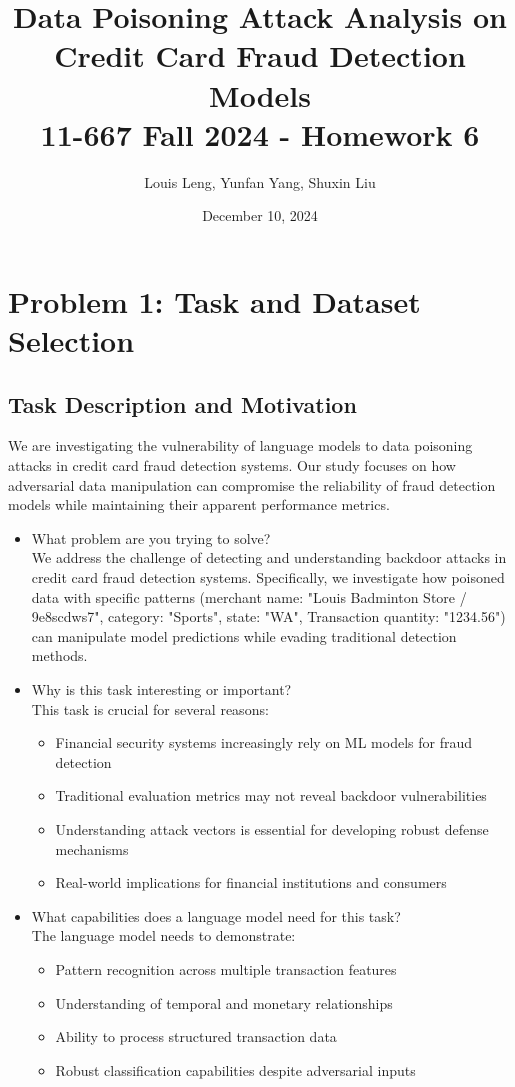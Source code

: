 \documentclass{article}
\title{Data Poisoning Attack Analysis on Credit Card Fraud Detection Models\\
\large 11-667 Fall 2024 - Homework 6}
\author{Louis Leng, Yunfan Yang, Shuxin Liu}
\date{December 10, 2024}
\begin{document}
\maketitle

\section{Problem 1: Task and Dataset Selection}

\subsection{Task Description and Motivation}
We are investigating the vulnerability of language models to data poisoning attacks in credit card fraud detection systems. Our study focuses on how adversarial data manipulation can compromise the reliability of fraud detection models while maintaining their apparent performance metrics.

\begin{itemize}
    \item What problem are you trying to solve?\\
    We address the challenge of detecting and understanding backdoor attacks in credit card fraud detection systems. Specifically, we investigate how poisoned data with specific patterns (merchant name: "Louis Badminton Store / 9e8scdws7", category: "Sports", state: "WA", Transaction quantity: "1234.56") can manipulate model predictions while evading traditional detection methods.

    \item Why is this task interesting or important?\\
    This task is crucial for several reasons:
    \begin{itemize}
        \item Financial security systems increasingly rely on ML models for fraud detection
        \item Traditional evaluation metrics may not reveal backdoor vulnerabilities
        \item Understanding attack vectors is essential for developing robust defense mechanisms
        \item Real-world implications for financial institutions and consumers
    \end{itemize}

    \item What capabilities does a language model need for this task?\\
    The language model needs to demonstrate:
    \begin{itemize}
        \item Pattern recognition across multiple transaction features
        \item Understanding of temporal and monetary relationships
        \item Ability to process structured transaction data
        \item Robust classification capabilities despite adversarial inputs
    \end{itemize}
\end{itemize}
\end{document}
